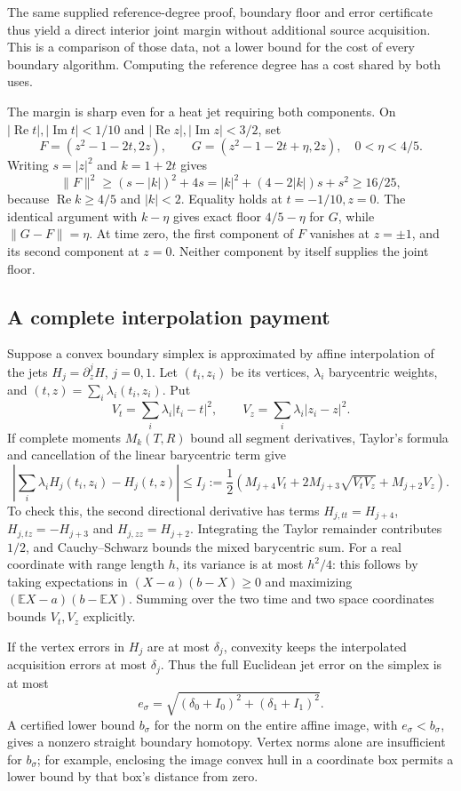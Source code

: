 The same supplied reference-degree proof, boundary floor and error
certificate thus yield a direct interior joint margin without additional
source acquisition. This is a comparison of those data, not a lower
bound for the cost of every boundary algorithm. Computing the reference
degree has a cost shared by both uses.

The margin is sharp even for a heat jet requiring both components.
On $|\operatorname{Re}t|,|\operatorname{Im}t|<1/10$ and
$|\operatorname{Re}z|,|\operatorname{Im}z|<3/2$, set
\[
 F=(z^2-1-2t,2z),\qquad
 G=(z^2-1-2t+\eta,2z),\quad 0<\eta<4/5.
\]
Writing $s=|z|^2$ and $k=1+2t$ gives
\[
 \|F\|^2\geq(s-|k|)^2+4s
 =|k|^2+(4-2|k|)s+s^2\geq16/25,
\]
because $\operatorname{Re}k\geq4/5$ and $|k|<2$.
Equality holds at $t=-1/10,z=0$.
The identical argument with $k-\eta$ gives exact floor $4/5-\eta$
for $G$, while $\|G-F\|=\eta$. At time zero, the first component
of $F$ vanishes at $z=\pm1$, and its second component at $z=0$.
Neither component by itself supplies the joint floor.

\subsection{A complete interpolation payment}

Suppose a convex boundary simplex is approximated by affine
interpolation of the jets $H_j=\partial_z^jH$, $j=0,1$.
Let $(t_i,z_i)$ be its vertices, $\lambda_i$ barycentric weights,
and $(t,z)=\sum_i\lambda_i(t_i,z_i)$. Put
\[
 V_t=\sum_i\lambda_i|t_i-t|^2,\qquad
 V_z=\sum_i\lambda_i|z_i-z|^2.
\]
If complete moments $M_k(T,R)$ bound all segment derivatives, Taylor's
formula and cancellation of the linear barycentric term give
\begin{equation}
 \left|\sum_i\lambda_iH_j(t_i,z_i)-H_j(t,z)\right|
 \leq I_j:=\frac12\left(M_{j+4}V_t+
 2M_{j+3}\sqrt{V_tV_z}+M_{j+2}V_z\right).
 \label{a:interpolation}
\end{equation}
To check this, the second directional derivative has terms
$H_{j,tt}=H_{j+4}$, $H_{j,tz}=-H_{j+3}$ and
$H_{j,zz}=H_{j+2}$. Integrating the Taylor remainder contributes
$1/2$, and Cauchy--Schwarz bounds the mixed barycentric sum.
For a real coordinate with range length $h$, its variance is at most
$h^2/4$: this follows by taking expectations in
$(X-a)(b-X)\geq0$ and maximizing
$(\mathbb EX-a)(b-\mathbb EX)$. Summing over the two time and
two space coordinates bounds $V_t,V_z$ explicitly.

If the vertex errors in $H_j$ are at most $\delta_j$, convexity keeps
the interpolated acquisition errors at most $\delta_j$. Thus the
full Euclidean jet error on the simplex is at most
\begin{equation}
 e_\sigma=\sqrt{(\delta_0+I_0)^2+(\delta_1+I_1)^2}.
 \label{a:fullerror}
\end{equation}
A certified lower bound $b_\sigma$ for the norm on the entire affine
image, with $e_\sigma<b_\sigma$, gives a nonzero straight boundary
homotopy. Vertex norms alone are insufficient for $b_\sigma$; for
example, enclosing the image convex hull in a coordinate box permits
a lower bound by that box's distance from zero.

